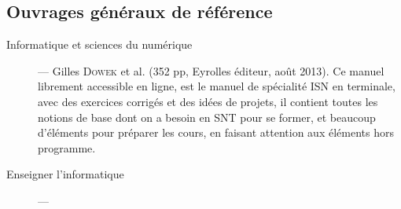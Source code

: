 
\subsection*{Ouvrages généraux de référence}

\begin{description}
\item[Informatique et sciences du numérique] --- 
Gilles \textsc{Dowek} et al. (352 pp, Eyrolles éditeur,  août 2013). Ce manuel librement accessible en ligne, est le manuel de spécialité ISN en terminale, avec des exercices corrigés et des idées de projets, il contient toutes les notions de base dont on a besoin en SNT pour se former, et beaucoup d'éléments pour préparer les cours, en faisant attention aux éléments hors programme.
\item[Enseigner l'informatique] --- 

\end{description}
